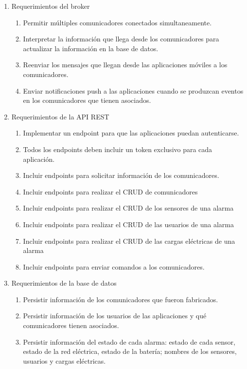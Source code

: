 \documentclass[
11pt, %
codirector, %
]{charter}
\begin{document}
\begin{enumerate}
	\item Requerimientos del broker
		\begin{enumerate}
			\item Permitir múltiples comunicadores conectados simultaneamente.
			\item Interpretar la información que llega desde los comunicadores para actualizar la información en la base de datos.
			\item Reenviar los mensajes que llegan desde las aplicaciones móviles a los comunicadores.
			\item Enviar notificaciones push a las aplicaciones cuando se produzcan eventos en los comunicadores que tienen asociados.
		\end{enumerate}
	\item Requerimientos de la API REST
		\begin{enumerate}
			\item Implementar un endpoint para que las aplicaciones puedan autenticarse.
			\item Todos los endpoints deben incluir un token exclusivo para cada aplicación.
			\item Incluir endpoints para solicitar información de los comunicadores.
			\item Incluir endpoints para realizar el CRUD de comunicadores
			\item Incluir endpoints para realizar el CRUD de los sensores de una alarma
			\item Incluir endpoints para realizar el CRUD de las usuarios de una alarma
			\item Incluir endpoints para realizar el CRUD de las cargas eléctricas de una alarma
			\item Incluir endpoints para enviar comandos a los comunicadores.
		\end{enumerate}
	\item Requerimientos de la base de datos
		\begin{enumerate}
			\item Persistir información de los comunicadores que fueron fabricados.
			\item Persistir información de los usuarios de las aplicaciones y qué comunicadores tienen asociados.
			\item Persistir información del estado de cada alarma: estado de cada sensor, estado de la red eléctrica, estado de la batería; nombres de los sensores, usuarios y cargas eléctricas.
		\end{enumerate}

\end{enumerate}
\end{document}
